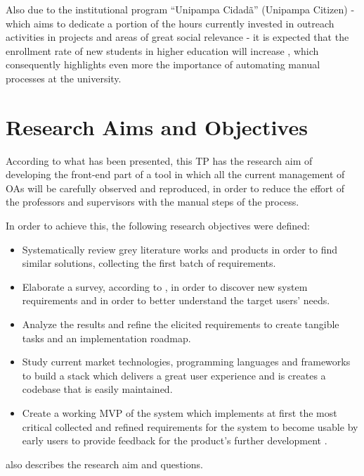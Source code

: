 Also due to the institutional program ``Unipampa Cidadã'' (Unipampa Citizen) - which aims to dedicate a portion of the hours currently invested in outreach activities in projects and areas of great social relevance - it is expected that the enrollment rate of new students in higher education will increase \cite{unipampacidada}, which consequently highlights even more the importance of automating manual processes at the university.

\section{Research Aims and Objectives}\label{sec:objectives}

According to what has been presented, this \ac{TP} has the research aim of developing the front-end part of a tool in which all the current management of \acp{OA} will be carefully observed and reproduced, in order to reduce the effort of the professors and supervisors with the manual steps of the process.

In order to achieve this, the following research objectives were defined:

\begin{itemize}
  \item Systematically review grey literature works and products in order to find similar solutions, collecting the first batch of requirements.
  \item Elaborate a survey, according to , in order to discover new system requirements and in order to better understand the target users' needs.
  \item Analyze the results and refine the elicited requirements to create tangible tasks and an implementation roadmap.
  \item Study current market technologies, programming languages and frameworks to build a stack which delivers a great user experience and is creates a codebase that is easily maintained.
  \item Create a working \ac{MVP} of the system which implements at first the most critical collected and refined requirements for the system to become usable by early users to provide feedback for the product's further development \cite{becker_2020}.
\end{itemize}

 also describes the research aim and questions.



